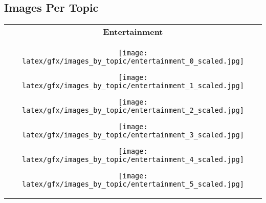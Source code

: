 
\begin{table*}[ht]
    \subsection{Images Per Topic}
    \label{app:images-per-topic}
    \centering
    \begin{tabular}{c}
       \toprule 
            \textbf{Entertainment}  \\ \cmidrule(lr){1-1}
                    \begin{minipage}{0.08\textwidth}
                        \centering
                        \texttt{[image: latex/gfx/images\_by\_topic/entertainment\_0\_scaled.jpg]}
                    \end{minipage}
                    \hfill
                    \begin{minipage}{0.08\textwidth}
                        \centering
                        \texttt{[image: latex/gfx/images\_by\_topic/entertainment\_1\_scaled.jpg]}
                    \end{minipage}
                    \hfill
                    \begin{minipage}{0.08\textwidth}
                        \centering
                        \texttt{[image: latex/gfx/images\_by\_topic/entertainment\_2\_scaled.jpg]}
                    \end{minipage}
                    \hfill
                    \begin{minipage}{0.08\textwidth}
                        \centering
                        \texttt{[image: latex/gfx/images\_by\_topic/entertainment\_3\_scaled.jpg]}
                    \end{minipage}
                    \hfill
                    \begin{minipage}{0.08\textwidth}
                        \centering
                        \texttt{[image: latex/gfx/images\_by\_topic/entertainment\_4\_scaled.jpg]}
                    \end{minipage}
                    \hfill
                    \begin{minipage}{0.08\textwidth}
                        \centering
                        \texttt{[image: latex/gfx/images\_by\_topic/entertainment\_5\_scaled.jpg]}
                    \end{minipage}

\end{tabular}
\end{table*}
